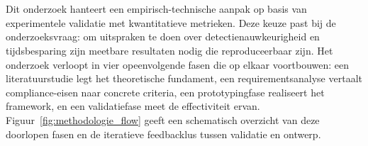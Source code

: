 
\chapter{}%
\label{ch:methodologie}


Dit onderzoek hanteert een empirisch-technische aanpak op basis van experimentele validatie met kwantitatieve metrieken. Deze keuze past bij de onderzoeksvraag: om uitspraken te doen over detectienauwkeurigheid en tijdsbesparing zijn meetbare resultaten nodig die reproduceerbaar zijn. Het onderzoek verloopt in vier opeenvolgende fasen die op elkaar voortbouwen: een literatuurstudie legt het theoretische fundament, een requirementsanalyse vertaalt compliance-eisen naar concrete criteria, een prototypingfase realiseert het framework, en een validatiefase meet de effectiviteit ervan. Figuur~\ref{fig:methodologie_flow} geeft een schematisch overzicht van deze doorlopen fasen en de iteratieve feedbacklus tussen validatie en ontwerp.

